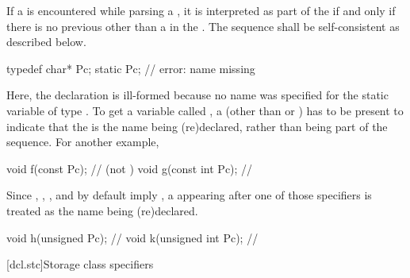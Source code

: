\pnum
{}%
If a  is encountered while parsing a ,
it is interpreted as part of the  if and only if there is no
previous  other than a  in the
.
The sequence shall be self-consistent as
described below.
\begin{example}
\begin{codeblock}
typedef char* Pc;
static Pc;                      // error: name missing
\end{codeblock}
Here, the declaration   is ill-formed because no
name was specified for the static variable of type . To get a
variable called , a  (other than
 or ) has to be present to indicate that
the   is the name being (re)declared,
rather than being part of the  sequence. For
another example,
\begin{codeblock}
void f(const Pc);               //  (not )
void g(const int Pc);           // 
\end{codeblock}
\end{example}

\pnum
{}%
%
%
%
\begin{note}
Since , , , and 
by default imply , a  appearing after one
of those specifiers is treated as the name being (re)declared.
\begin{example}
\begin{codeblock}
void h(unsigned Pc);            // 
void k(unsigned int Pc);        // 
\end{codeblock}
\end{example}
\end{note}

[dcl.stc]{Storage class specifiers}%
%
%
%
%
%

